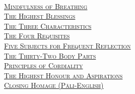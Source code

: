 {  \clearpage

  {\libertinusFont\selectfont\textbf{\textsc{\ifafiveversion\fontsize{18}{12}\fi\ifasixversion\fontsize{13}{8.5}\fi\selectfont{}}}}\\

  \textsc{\ifafiveversion\fontsize{14.4}{28}\fi\ifasixversion\fontsize{10}{20}\fi\selectfont
    \hyperref[mindfulness-of-breathing]{Mindfulness of Breathing} \ifdigitalversion\else\pageref{mindfulness-of-breathing}\fi\\
    \hyperref[highest-blessings]{The Highest Blessings} \ifdigitalversion\else\pageref{highest-blessings}\fi\\
    \hyperref[three-characteristics]{The Three Characteristics} \ifdigitalversion\else\pageref{three-characteristics}\fi\\
    \hyperref[four-requisites]{The Four Requisites} \ifdigitalversion\else\pageref{four-requisites}\fi\\
    \hyperref[five-reflections]{Five Subjects for Frequent Reflection} \ifdigitalversion\else\pageref{five-reflections}\fi\\
    \hyperref[32-parts]{The Thirty-Two Body Parts} \ifdigitalversion\else\pageref{32-parts}\fi\\
    \hyperref[principles-of-cordiality]{Principles of Cordiality} \ifdigitalversion\else\pageref{principles-of-cordiality}\fi\\
    \hyperref[highest-honour-aspirations]{The Highest Honour and Aspirations} \ifdigitalversion\else\pageref{highest-honour-aspirations}\fi\\
    \hyperref[closing-homage]{Closing Homage (Pāli-English)} \ifdigitalversion\else\pageref{closing-homage}\fi\\
  }

  \vspace{1.0cm}

  {\libertinusFont\selectfont\textbf{\textsc{\ifafiveversion\fontsize{18}{12}\fi\ifasixversion\fontsize{13}{8.5}\fi\selectfont{}}}}\\

}
